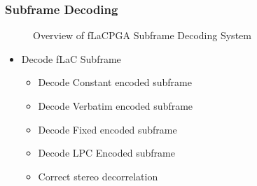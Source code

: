 \documentclass[12pt]{scrartcl}
\begin{document}
  \subsubsection{Subframe Decoding}
  \begin{figure}[H]
    \caption{Overview of fLaCPGA Subframe Decoding System}
    \label{fig:subframe_overview}
  \end{figure}
  
  \begin{itemize}
  \item Decode fLaC Subframe
    \begin{itemize}
    \item Decode Constant encoded subframe
    \item Decode Verbatim encoded subframe
    \item Decode Fixed encoded subframe
    \item Decode LPC Encoded subframe
    \item Correct stereo decorrelation
    \end{itemize}
  \end{itemize}
  
\end{document}
